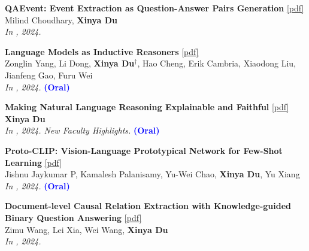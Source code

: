 \begin{enumerate}[{[}1{]},resume,leftmargin=*]
\parbox{\linewidth}{
\item
 
{\bf QAEvent: Event Extraction as Question-Answer Pairs Generation} 
\href{https://aclanthology.org/2024.findings-eacl.126.pdf}{{[pdf]}} \\
Milind Choudhary, \textbf{Xinya Du} \\
{\it In \EACLfinding, 2024.} \\
}

\parbox{\linewidth}{
\item
 
{\bf Language Models as Inductive Reasoners} 
\href{https://aclanthology.org/2024.eacl-long.13.pdf}{{[pdf]}} \\
Zonglin Yang, Li Dong, \textbf{Xinya Du}$^{\dagger}$, Hao Cheng, Erik Cambria, Xiaodong Liu, Jianfeng Gao, Furu Wei \\
{\it In \EACL, 2024.} {\textcolor{blue}{\textbf{(Oral)}}} \\ 
}

\parbox{\linewidth}{
\item\label{pub:aaai24}
 
{\bf Making Natural Language Reasoning Explainable and Faithful} 
      \href{https://ojs.aaai.org/index.php/AAAI/article/view/30280}{{[pdf]}} \\
      \textbf{Xinya Du} \\
{\it In \AAAI, 2024. New Faculty Highlights.} {\textcolor{blue}{\textbf{(Oral)}}} \\ 
}

\parbox{\linewidth}{
\item
 
{\bf Proto-CLIP: Vision-Language Prototypical Network for Few-Shot Learning} 
\href{https://arxiv.org/pdf/2307.03073}{{[pdf]}} \\
Jishnu Jaykumar P, Kamalesh Palanisamy, Yu-Wei Chao, \textbf{Xinya Du}, Yu Xiang \\
{\it In \IROS, 2024.} {\textcolor{blue}{\textbf{(Oral)}}} \\
}

\parbox{\linewidth}{
\item
 
{\bf Document-level Causal Relation Extraction with Knowledge-guided Binary Question Answering} 
\href{https://arxiv.org/pdf/2410.04752}{{[pdf]}} \\
Zimu Wang, Lei Xia, Wei Wang, \textbf{Xinya Du}  \\
{\it In \EMNLPfinding, 2024.} \\
}


\end{enumerate}
